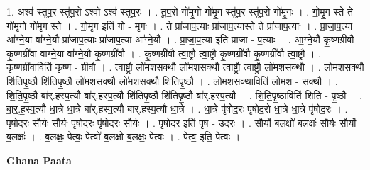 \documentclass[17pt]{extarticle}
\begin{document}
1. अश्व॑ स्तूप॒र स्तू॑प॒रो ऽश्वो ऽश्व॑ स्तूप॒रः । . तू॒प॒रो गो॑मृ॒गो गो॑मृ॒ग स्तू॑प॒र स्तू॑प॒रो गो॑मृ॒गः । . गो॒मृ॒ग स्ते ते गो॑मृ॒गो गो॑मृ॒ग स्ते । . गो॒मृ॒ग इति॑ गो - मृ॒गः । . ते प्रा॑जाप॒त्याः प्रा॑जाप॒त्यास्ते ते प्रा॑जाप॒त्याः । . प्रा॒जा॒प॒त्या आ᳚ग्ने॒या वा᳚ग्ने॒यौ प्रा॑जाप॒त्याः प्रा॑जाप॒त्या आ᳚ग्ने॒यौ । . प्रा॒जा॒प॒त्या इति॑ प्राजा - प॒त्याः । . आ॒ग्ने॒यौ कृ॒ष्णग्री॑वौ कृ॒ष्णग्री॑वा वाग्ने॒या वा᳚ग्ने॒यौ कृ॒ष्णग्री॑वौ । . कृ॒ष्णग्री॑वौ त्वा॒ष्ट्रौ त्वा॒ष्ट्रौ कृ॒ष्णग्री॑वौ कृ॒ष्णग्री॑वौ त्वा॒ष्ट्रौ । . कृ॒ष्णग्री॑वा॒विति॑ कृ॒ष्ण - ग्री॒वौ॒ । . त्वा॒ष्ट्रौ लो॑मशस॒क्थौ लो॑मशस॒क्थौ त्वा॒ष्ट्रौ त्वा॒ष्ट्रौ लो॑मशस॒क्थौ । . लो॒म॒श॒स॒क्थौ शि॑तिपृ॒ष्ठौ शि॑तिपृ॒ष्ठौ लो॑मशस॒क्थौ लो॑मशस॒क्थौ शि॑तिपृ॒ष्ठौ । . लो॒म॒श॒स॒क्थाविति॑ लोमश - स॒क्थौ । . शि॒ति॒पृ॒ष्ठौ बा॑र्.हस्प॒त्यौ बा॑र्.हस्प॒त्यौ शि॑तिपृ॒ष्ठौ शि॑तिपृ॒ष्ठौ बा॑र्.हस्प॒त्यौ । . शि॒ति॒पृ॒ष्ठाविति॑ शिति - पृ॒ष्ठौ । . बा॒र्॒.ह॒स्प॒त्यौ धा॒त्रे धा॒त्रे बा॑र्.हस्प॒त्यौ बा॑र्.हस्प॒त्यौ धा॒त्रे । . धा॒त्रे पृ॑षोद॒रः पृ॑षोद॒रो धा॒त्रे धा॒त्रे पृ॑षोद॒रः । . पृ॒षो॒द॒रः सौ॒र्यः सौ॒र्यः पृ॑षोद॒रः पृ॑षोद॒रः सौ॒र्यः । . पृ॒षो॒द॒र इति॑ पृष - उ॒द॒रः । . सौ॒र्यो ब॒लक्षो॑ ब॒लक्षः॑ सौ॒र्यः सौ॒र्यो ब॒लक्षः॑ । . ब॒लक्षः॒ पेत्वः॒ पेत्वो॑ ब॒लक्षो॑ ब॒लक्षः॒ पेत्वः॑ । . पेत्व॒ इति॒ पेत्वः॑ । \newline

\textbf{Ghana Paata } \newline
\end{document}
